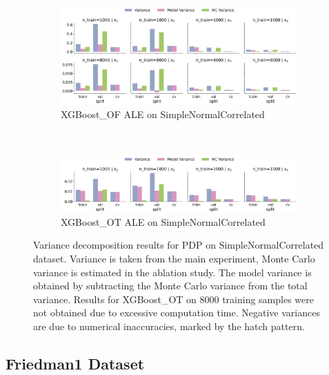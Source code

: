 \documentclass[runningheads]{llncs}
\begin{document}
\begin{figure}[htbp]
    \centering
    \begin{subfigure}[b]{0.75\textwidth}
        \includegraphics[width=\textwidth]{img/SNC-all/variance_decomposition_ale_XGBoost_OF.png}
        \caption{XGBoost\_OF ALE on SimpleNormalCorrelated}
    \end{subfigure}
    \\[10pt]
    \vfill
    \begin{subfigure}[b]{0.75\textwidth}
        \includegraphics[width=\textwidth]{img/SNC-all/variance_decomposition_ale_XGBoost_OT.png}
        \caption{XGBoost\_OT ALE on SimpleNormalCorrelated}
    \end{subfigure}
    \caption{Variance decomposition results for PDP on SimpleNormalCorrelated dataset. Variance is taken from the
        main experiment, Monte Carlo variance is estimated in the ablation study. The model variance is
        obtained by subtracting the Monte Carlo variance from the total variance. Results for XGBoost\_OT
        on 8000 training samples were not obtained due to excessive computation time. Negative variances are
        due to numerical inaccuracies, marked by the hatch pattern.}
    \label{fig:ale-variance-decomp-snc}  %
\end{figure}

\clearpage
\subsection{Friedman1 Dataset}
\end{document}
